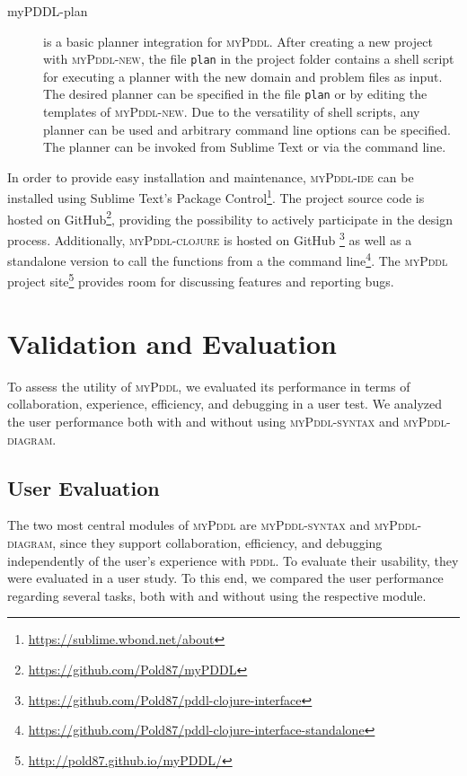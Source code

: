 \documentclass[runningheads]{llncs}
\newcommand{\mypddl}{\textsc{myPddl}\xspace}
\newcommand{\mypddlclojure}{\textsc{myPddl-clojure}\xspace}
\newcommand{\mypddlsyntax}{\textsc{myPddl-syntax}\xspace}
\newcommand{\mypddldiagram}{\textsc{myPddl-diagram}\xspace}
\newcommand{\mypddlnew}{\textsc{myPddl-new}\xspace}
\newcommand{\mypddlide}{\textsc{myPddl-ide}\xspace}
\newcommand{\pddl}{\textsc{pddl}\xspace}
\newcommand{\sublimetext}{Sublime Text\xspace}
\begin{document}
\begin{description}
\item[myPDDL-plan] is a basic planner integration for \mypddl. After
  creating a new project with \mypddlnew, the file \texttt{plan} in
  the project folder contains a shell script for executing a planner
  with the new domain and problem files as input. The desired planner
  can be specified in the file \texttt{plan} or by editing the
  templates of \mypddlnew. Due to the versatility of shell scripts,
  any planner can be used and arbitrary command line options can be
  specified. The planner can be invoked from Sublime Text or via the
  command line.
\end{description}


In order to provide easy installation and maintenance, \mypddlide can
be installed using \sublimetext's Package
Control\footnote{\url{https://sublime.wbond.net/about}}.  The project
source code is hosted on
GitHub\footnote{\url{https://github.com/Pold87/myPDDL}}, providing the
possibility to actively participate in the design
process. Additionally, \mypddlclojure is hosted on GitHub
\footnote{\url{https://github.com/Pold87/pddl-clojure-interface}} as
well as a standalone version to call the functions from a the command
line\footnote{\url{https://github.com/Pold87/pddl-clojure-interface-standalone}}.
The \mypddl project
site\footnote{\url{http://pold87.github.io/myPDDL/}} provides room for
discussing features and reporting bugs.

\section{Validation and Evaluation}
\label{sec:valid-eval}

To assess the utility of \mypddl, we evaluated its performance in
terms of collaboration, experience, efficiency, and debugging in a
user test. We analyzed the user performance both with and without
using \mypddlsyntax and \mypddldiagram.

\subsection{User Evaluation}

The two most central modules of \mypddl are \mypddlsyntax and
\mypddldiagram, since they support collaboration, efficiency, and
debugging independently of the user’s experience with \pddl. To
evaluate their usability, they were evaluated in a user study. To this
end, we compared the user performance regarding several tasks, both
with and without using the respective module.
\end{document}
